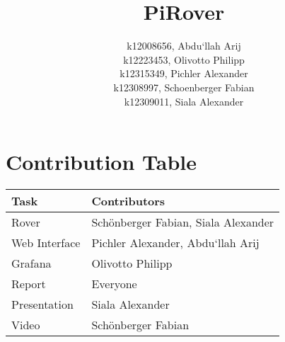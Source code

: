 \documentclass[12pt]{article}
\begin{document}
    \title{PiRover}

    \date{}
    \author{
        k12008656, Abdu`llah Arij\\
        k12223453, Olivotto Philipp\\
        k12315349, Pichler Alexander\\
        k12308997, Schoenberger Fabian\\
        k12309011, Siala Alexander
    }

    \maketitle
    \tableofcontents

    \section*{Contribution Table}
    \begin{flushleft}
        \begin{minipage}{0.6\textwidth}
            \begin{table}[H]
                \centering
                \renewcommand{\arraystretch}{1.3}
                \begin{tabular}{|l|p{7.5cm}|}
                    \hline
                    \textbf{Task} & \textbf{Contributors} \\
                    \hline
                    Rover & Schönberger Fabian, Siala Alexander \\
                    Web Interface & Pichler Alexander, Abdu`llah Arij  \\
                    Grafana & Olivotto Philipp \\
                    Report & Everyone \\
                    Presentation &  Siala Alexander \\
                    Video & Schönberger Fabian \\
                    \hline
                \end{tabular}\label{tab:table}
            \end{table}
        \end{minipage}
    \end{flushleft}

    \newpage

    
    
    
    
    
    
    
    
\end{document}
